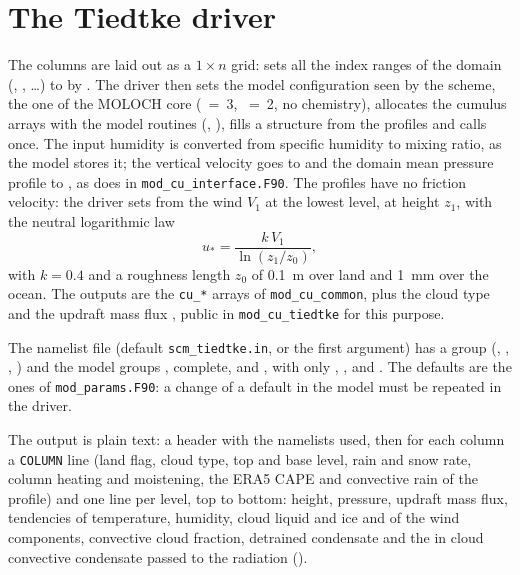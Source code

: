 \section{The Tiedtke driver}

The columns are laid out as a $1 \times n$ grid:  sets all
the index ranges of the domain (, ,
\ldots) to  by . The driver then sets the model
configuration seen by the scheme, the one of the MOLOCH core
(~=~3, ~=~2, no chemistry), allocates the
cumulus arrays with the model routines (,
), fills a  structure
from the profiles and calls  once. The input humidity is
converted from specific humidity to mixing ratio, as the model stores it;
the vertical velocity goes to  and the domain mean pressure
profile to , as  does in
\verb=mod_cu_interface.F90=. The profiles have no friction velocity: the
driver sets  from the wind $V_1$ at the lowest level, at height
$z_1$, with the neutral logarithmic law
\begin{equation}
  u_* = \frac{k\,V_1}{\ln(z_1/z_0)} ,
\end{equation}
with $k = 0.4$ and a roughness length $z_0$ of 0.1~m over land and
1~mm over the ocean. The outputs are the \verb=cu_*= arrays of
\verb=mod_cu_common=, plus the cloud type  and the updraft
mass flux , public in \verb=mod_cu_tiedtke= for this purpose.

The namelist file (default \verb=scm_tiedtke.in=, or the first argument)
has a  group (, , ,
) and the model groups , complete, and
, with only , ,
 and . The defaults are the ones of \verb=mod_params.F90=: a
change of a default in the model must be repeated in the driver.

The output is plain text: a header with the namelists used, then for each
column a \verb=COLUMN= line (land flag, cloud type, top and base level,
rain and snow rate, column heating and moistening, the ERA5 CAPE and
convective rain of the profile) and one line per level, top to bottom:
height, pressure, updraft mass flux, tendencies of temperature, humidity,
cloud liquid and ice and of the wind components, convective cloud fraction,
detrained condensate and the in cloud convective condensate passed to the
radiation ().

